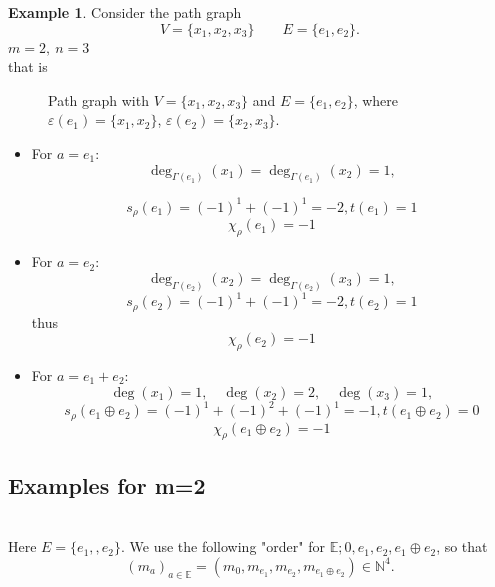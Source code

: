 \documentclass[preprint,12pt,authoryear]{elsarticle}
\theoremstyle{definition}
\newtheorem{examp}{Example}
\begin{document}

\begin{examp}
Consider the path graph
\[
V= \{x_1, x_2 , x_3\}
\qquad
E=\{e_1,e_2\}.
\]
$m=2,~ n=3$\\
that is

\begin{figure}[h]
\centering
{}
\caption{\footnotesize Path graph with $V=\{x_1,x_2,x_3\}$ and $E=\{e_1,e_2\}$, where $\varepsilon(e_1)=\{x_1,x_2\}$, $\varepsilon(e_2)=\{x_2,x_3\}$.}
\label{fig:path-graph}
\end{figure}

\begin{itemize}
\item For $a=e_1$:
\[
\deg_{\Gamma(e_1)}(x_1)=\deg_{\Gamma(e_1)}(x_2)=1,
\]

\[
s_{\rho}(e_1)=(-1)^1+(-1)^1=-2, t(e_1)=1
\]
\[
\chi_{\rho}(e_1)= -1
\]
\item For $a=e_2$:
\[
\deg_{\Gamma(e_2)}(x_2)=\deg_{\Gamma(e_2)}(x_3)=1,
\]
\[
s_{\rho}(e_2)=(-1)^1+(-1)^1=-2, t(e_2)=1
\]
thus
\[
\chi_{\rho}(e_2)= -1
\]

\item For $a=e_1+e_2$:
\[
\deg(x_1)=1,\quad \deg(x_2)=2,\quad \deg(x_3)=1,
\]
\[
s_{\rho}(e_1 \oplus e_2)=(-1)^1+(-1)^2+(-1)^1=-1, t(e_1 \oplus e_2)=0
\]
\[
\chi_{\rho}(e_1\oplus e_2)= -1
\]

\end{itemize}
\end{examp}



\subsection{Examples for m=2} \mbox{}\\

Here $E=\{ e_1,,e_2 \}$.
We use the following "order" for $\mathbb{E}; 0, e_1, e_2, e_1\oplus e_2$, so that 
$$(m_a)_{a \in \mathbb{E}}=(m_0, m_{e_1}, m_{e_2}, m_{e_1 \oplus e_2}) \in \mathbb{N}^4.$$
\end{document}
